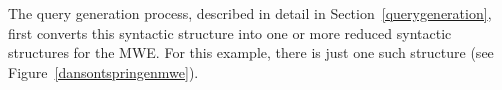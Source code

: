 \documentclass[output=paper,colorlinks,citecolor=brown]{langscibook}
\begin{document}

The query generation process,  described in detail in Section~\ref{querygeneration}, first converts this syntactic structure into one or more reduced syntactic structures for the MWE. For this example, there is just one such structure (see Figure~\ref{dansontspringenmwe}).
\end{document}
